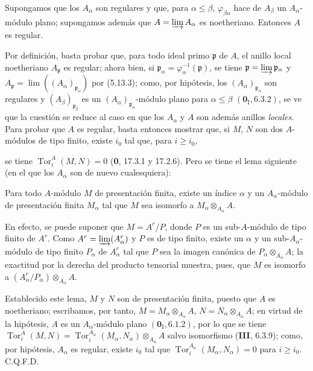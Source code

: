 \begin{proposition}[5.13.7]
\label{IV.2.s5.13.7-fr}
Supongamos que los $A_\alpha$ son regulares y que, para
$\alpha\leq\beta$, $\varphi_{\beta\alpha}$ hace de $A_\beta$ un
$A_\alpha$-módulo plano; supongamos además que
$A=\varinjlim A_\alpha$ es noetheriano. Entonces $A$ es regular.
\end{proposition}

Por definición, basta probar que, para todo ideal primo $\mathfrak p$ de $A$,
el anillo local noetheriano $A_{\mathfrak p}$ es regular; ahora bien, si
$\mathfrak p_\alpha=\varphi_\alpha^{-1}(\mathfrak p)$, se tiene
$\mathfrak p=\varinjlim\mathfrak p_\alpha$ y
$A_{\mathfrak p}=\lim((A_\alpha)_{\mathfrak p_\alpha})$ por (5.13.3);
como, por hipótesis, los $(A_\alpha)_{\mathfrak p_\alpha}$ son regulares y
$(A_\beta)_{\mathfrak p_\beta}$ es un
$(A_\alpha)_{\mathfrak p_\alpha}$-módulo plano para
$\alpha\leq\beta$ $(\mathbf{0}_{\mathrm I}, 6.3.2)$, se ve que la cuestión se reduce al
caso en que los $A_\alpha$ y $A$ son además anillos \emph{locales}. Para probar que
$A$ es regular, basta entonces mostrar que, si $M$, $N$ son dos $A$-módulos de
tipo finito, existe $i_0$ tal que, para $i\geq i_0$,


se tiene $\operatorname{Tor}^A_i(M,N)=0$ (\textbf 0, 17.3.1 y 17.2.6). Pero se tiene
el lema siguiente (en el que los $A_\alpha$ son de nuevo cualesquiera):

\begin{lemma}[5.13.7.1]
\label{IV.2.s5.13.7.1-fr}
Para todo $A$-módulo $M$ de presentación finita, existe un índice $\alpha$ y
un $A_\alpha$-módulo de presentación finita $M_\alpha$ tal que $M$ sea
isomorfo a $M_\alpha\otimes_{A_\alpha}A$.
\end{lemma}

En efecto, se puede suponer que $M=A^r/P$, donde $P$ es un sub-$A$-módulo de
tipo finito de $A^r$. Como $A^r=\varinjlim(A_\alpha^r)$ y $P$ es de tipo
finito, existe un $\alpha$ y un sub-$A_\alpha$-módulo de tipo finito
$P_\alpha$ de $A_\alpha^r$ tal que $P$ sea la imagen canónica de
$P_\alpha\otimes_{A_\alpha}A$; la exactitud por la derecha del producto
tensorial muestra, pues, que $M$ es isomorfo a
$(A_\alpha^r/P_\alpha)\otimes_{A_\alpha}A$.

Establecido este lema, $M$ y $N$ son de presentación finita, puesto que $A$ es
noetheriano; escribamos, por tanto,
$M=M_\alpha\otimes_{A_\alpha}A$,
$N=N_\alpha\otimes_{A_\alpha}A$; en virtud de la hipótesis, $A$ es un
$A_\alpha$-módulo plano $(\mathbf{0}_{\mathrm I}, 6.1.2)$, por lo que se tiene
$\operatorname{Tor}^A_i(M,N)
=\operatorname{Tor}^{A_\alpha}_i(M_\alpha,N_\alpha)
 \otimes_{A_\alpha}A$
salvo isomorfismo (\textbf{III}, 6.3.9); como, por hipótesis, $A_\alpha$ es regular,
existe $i_0$ tal que
$\operatorname{Tor}^{A_\alpha}_i(M_\alpha,N_\alpha)=0$ para $i\geq i_0$.
C.Q.F.D.

